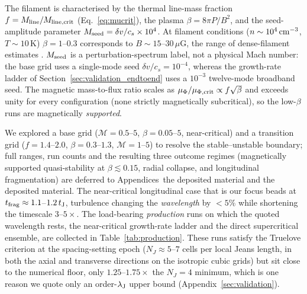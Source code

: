 \documentclass[usenatbib,twoside,twocolumn]{mnras}
\begin{document}
The filament is characterised by the thermal line-mass fraction $f=M_{\rm line}/M_{\rm line,crit}$ (Eq.~\ref{eq:mucrit}), the plasma $\beta=8\pi P/B^2$, and the seed-amplitude parameter $M_{\rm seed}=\delta v/c_s\times10^{4}$. At filament conditions ($n\sim10^4\,{\rm cm^{-3}}$, $T\sim10$\,K) $\beta=1$--$0.3$ corresponds to $B\sim15$--$30\,\mu$G, the range of dense-filament estimates \citep{Crutcher2012}. $M_{\rm seed}$ is a perturbation-spectrum label, not a physical Mach number: the base grid uses a single-mode seed $\delta v/c_s=10^{-4}$, whereas the growth-rate ladder of Section~\ref{sec:validation_endtoend} uses a $10^{-3}$ twelve-mode broadband seed. The magnetic mass-to-flux ratio scales as $\mu_\Phi/\mu_{\Phi,\rm crit}\propto f\sqrt{\beta}$ and exceeds unity for every configuration (none strictly magnetically subcritical), so the low-$\beta$ runs are magnetically \emph{supported}.

We explored a base grid ($\mathcal{M}=0.5$--$5$, $\beta=0.05$--$5$, near-critical) and a transition grid ($f=1.4$--$2.0$, $\beta=0.3$--$1.3$, $\mathcal{M}=1$--$5$) to resolve the stable--unstable boundary; full ranges, run counts and the resulting three outcome regimes (magnetically supported quasi-stability at $\beta\lesssim0.15$, radial collapse, and longitudinal fragmentation) are deferred to Appendices~the deposited material and the deposited material. The near-critical longitudinal case that is our focus beads at $t_{\rm frag}\approx1.1$--$1.2\,t_{\rm J}$, turbulence changing the \emph{wavelength} by $<5\%$ while shortening the timescale $3$--$5\times$. The load-bearing \emph{production} runs on which the quoted wavelength rests, the near-critical growth-rate ladder and the direct supercritical ensemble, are collected in Table~\ref{tab:production}. These runs satisfy the Truelove criterion at the spacing-setting epoch ($N_J\approx5$--$7$ cells per local Jeans length, in both the axial and transverse directions on the isotropic cubic grids) but sit close to the numerical floor, only $1.25$--$1.75\times$ the $N_J=4$ minimum, which is one reason we quote only an order-$\lambda_{\rm J}$ upper bound (Appendix~\ref{sec:validation}).
\end{document}
